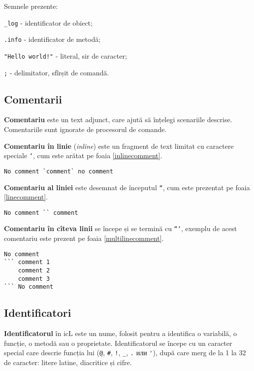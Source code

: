 Semnele prezente:
\begin{icItems}
\item
	\lstinline`_log` - identificator de obiect;
\item
	\lstinline`.info` - identificator de metodă;
\item
	\lstinline`"Hello world!"` - literal, sir de caracter;
\item
	\lstinline`;` - delimitator, sfîrșit de comandă.
\end{icItems}

\subsection{Comentarii}

\textbf{Comentariu} este un text adjunct, care ajută să înțelegi scenariile descrise. Comentariile sunt ignorate de procesorul de comande.

\textbf{Comentariu în linie} (\textit{inline}) este un fragment de text limitat cu caractere speciale \texttt{`}, cum este arătat pe foaia \ref{inlinecomment}.

\begin{lstlisting}[caption=Comentariu în linie,label=inlinecomment]
No comment `comment` no comment
\end{lstlisting}

\textbf{Comentariu al liniei} este desemnat de începutul \texttt{``}, cum este prezentat pe foaia \ref{linecomment}.

\begin{lstlisting}[caption=Comentariu al liniei,label=linecomment]
No comment `` comment
\end{lstlisting}

\textbf{Comentariu în cîteva linii} se începe și se termină cu \texttt{```}, exemplu de acest comentariu este prezent pe foaia \ref{multilinecomment}.

\begin{lstlisting}[caption=Comentariu în cîteva linii,label=multilinecomment]
No comment
``` comment 1
	comment 2
	comment 3
``` No comment
\end{lstlisting}

\subsection{Identificatori}

\textbf{Identificatorul} în icL este un nume, folosit pentru a identifica o variabilă, o funcție, o metodă sau o proprietate. Identificatorul se începe cu un caracter special care descrie funcția lui (\lstinline`@`, \lstinline`#`, \lstinline`!`, \lstinline`_`, \lstinline`.` или \lstinline`'`), după care merg de la 1 la 32 de caracter: litere latine, diacritice și cifre.

